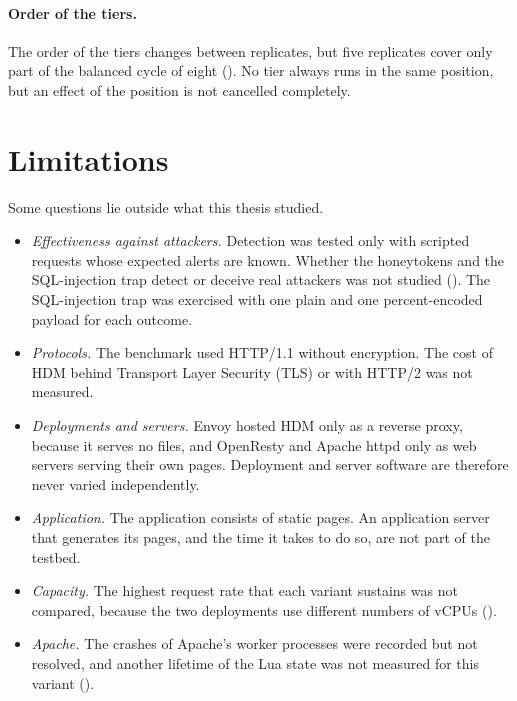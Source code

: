 \documentclass{rptuma}
\begin{document}
\paragraph{Order of the tiers.} The order of the tiers changes between replicates, but five
replicates cover only part of the balanced cycle of eight (). No tier
always runs in the same position, but an effect of the position is not cancelled completely.

\clearpage
\section{Limitations}
\label{sec:disc.limits}

Some questions lie outside what this thesis studied.
\begin{itemize}
  \item \emph{Effectiveness against attackers.} Detection was tested only with scripted requests
    whose expected alerts are known. Whether the honeytokens and the SQL-injection trap detect or
    deceive real attackers was not studied (). The SQL-injection trap
    was exercised with one plain and one percent-encoded payload for each outcome.
  \item \emph{Protocols.} The benchmark used HTTP/1.1 without encryption. The cost of HDM behind
    Transport Layer Security (TLS) or with HTTP/2 was not measured.
  \item \emph{Deployments and servers.} Envoy hosted HDM only as a reverse proxy, because it
    serves no files, and OpenResty and Apache httpd only as web servers serving their own pages.
    Deployment and server software are therefore never varied independently.
  \item \emph{Application.} The application consists of static pages. An application server that
    generates its pages, and the time it takes to do so, are not part of the testbed.
  \item \emph{Capacity.} The highest request rate that each variant sustains was not compared,
    because the two deployments use different numbers of vCPUs ().
  \item \emph{Apache.} The crashes of Apache's worker processes were recorded but not resolved, and
    another lifetime of the Lua state was not measured for this variant
    ().
\end{itemize}
\end{document}
